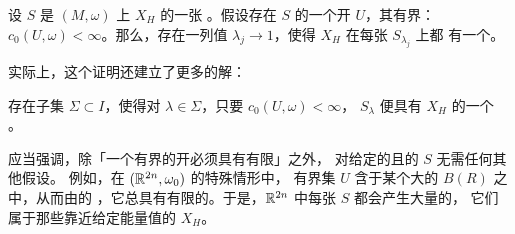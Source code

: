 \begin{theorem}[\trHofer-\trZehnder]\label{thm:hz-energy-surface}
设 $S$ 是 $(M,\omega)$ 上\trHamiltonianVectorField{} $X_{H}$ 的一张%
\trCompact\trRegular\trEnergySurface。假设存在 $S$ 的一个开\trNeighborhood{}%
$U$，其\trCapacity{}有界：$c_{0}(U,\omega)<\infty$。那么，存在一列\trEnergy{}值%
$\lambda_{j}\to1$，使得 $X_{H}$ 在每张\trEnergySurface{} $S_{\lambda_{j}}$ 上都%
有一个\trPeriodicSolution。
\end{theorem}

实际上，这个证明还建立了更多的解：

\begin{corollary}\label{cor:dense-energy-values}
存在\trDense{}子集 $\Sigma\subset I$，使得对 $\lambda\in\Sigma$，只要%
$c_{0}(U,\omega)<\infty$，\trEnergySurface{} $S_{\lambda}$ 便具有 $X_{H}$ 的一个%
\trPeriodicSolution。
\end{corollary}

应当强调，除「一个有界的开\trNeighborhood{}必须具有有限\trCapacity{}」之外，%
对给定的\trRegular{}且\trCompact{}的\trEnergySurface{} $S$ 无需任何其他假设。%
例如，在\trStandard\trSymplecticManifold{} $(\mathbb{R}^{2n},\omega_{0})$ 的特殊情形中，%
有界集 $U$ 含于某个大的\trBall{} $B(R)$ 之中，从而由\trCapacity{}的%
\trMonotonicity，它总具有有限的\trCapacity。于是，$\mathbb{R}^{2n}$ 中每张%
\trCompact\trRegular\trEnergySurface{} $S$ 都会产生大量的\trPeriodicSolution，%
它们属于那些\trEnergy{}靠近给定能量值的\trHamiltonianVectorField{} $X_{H}$。


